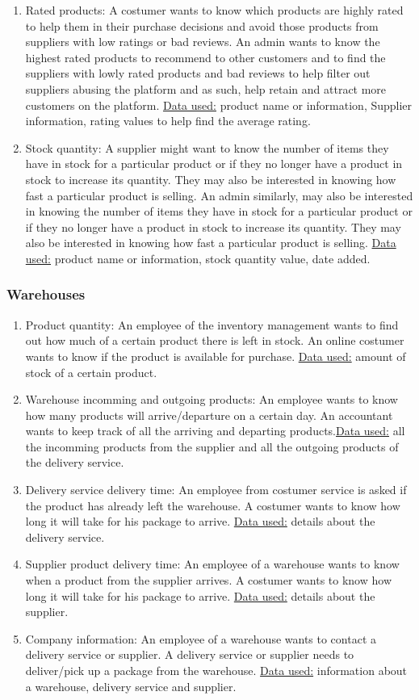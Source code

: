 \documentclass{article}
\begin{document}
\begin{enumerate}
  \item Rated products: A costumer wants to know which products are highly rated to help them in their purchase decisions and avoid those products from suppliers with low ratings or bad reviews. An admin wants to know the highest rated products to recommend to other customers and to find the suppliers with lowly rated products and bad reviews to help filter out suppliers abusing the platform and as such, help retain and attract more customers on the platform.  \underline{Data used:} product name or information, Supplier information, rating values to help find the average rating.
  \item Stock quantity: A supplier might want to know the number of items they have in stock for a particular product or if they no longer have a product in stock to increase its quantity. They may also be interested in knowing how fast a particular product is selling. An admin similarly, may also be interested in knowing the number of items they have in stock for a particular product or if they no longer have a product in stock to increase its quantity. They may also be interested in knowing how fast a particular product is selling. \underline{Data used:} product name or information, stock quantity value, date added.
\end{enumerate}

\subsubsection{Warehouses}
\begin{enumerate}
  \item Product quantity: An employee of the inventory management wants to find out how much of a certain product there is left in stock. An online costumer wants to know if the product is available for purchase.
  \underline{Data used:} amount of stock of a certain product.
  \item Warehouse incomming and outgoing products: An employee wants to know how many products will arrive/departure on a certain day. An accountant wants to keep track of all the arriving and departing products.\underline{Data used:} all the incomming products from the supplier and all the outgoing products of the delivery service.
  \item Delivery service delivery time: An employee from costumer service is asked if the product has already left the warehouse. A costumer wants to know how long it will take for his package to arrive.
  \underline{Data used:} details about the delivery service.
  \item Supplier product delivery time: An employee of a warehouse wants to know when a product from the supplier arrives. A costumer wants to know how long it will take for his package to arrive.
  \underline{Data used:} details about the supplier.
  \item Company information: An employee of a warehouse wants to contact a delivery service or supplier. A delivery service or supplier needs to deliver/pick up a package from the warehouse.
  \underline{Data used:} information about a warehouse, delivery service and supplier.
\end{enumerate}
\end{document}
